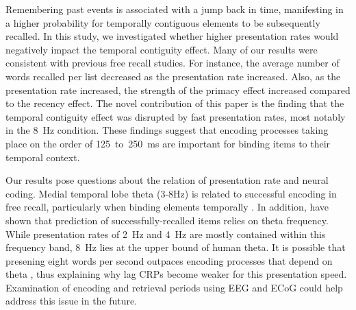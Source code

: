 \documentclass[10pt,letterpaper]{article}
\begin{document}
Remembering past events is associated with a jump back in time, manifesting in
a higher probability for temporally contiguous elements to be subsequently
recalled. In this study, we investigated whether higher presentation rates
would negatively impact the temporal contiguity effect. 
Many of our results were consistent with previous free recall studies. For
instance, the average number of words recalled per list decreased as the
presentation rate increased. Also, as the presentation rate increased, the
strength of the primacy effect increased compared to the recency effect.
The novel contribution of this paper is the finding that 
the temporal contiguity effect was disrupted by fast presentation rates, most
notably in the 8~Hz condition.   These findings suggest that encoding
processes taking place on the order of 125~to~250~ms are important for binding
items to their temporal context.

Our results pose questions about the relation of presentation rate and neural
coding. Medial temporal lobe theta (3-8Hz) is related to successful encoding
in free recall, particularly when binding elements temporally
\cite{NyhuCurr10,SedeEtal03}. In addition,  have shown that
prediction of successfully-recalled items relies on theta frequency. While
presentation rates of 2~Hz and 4~Hz are mostly contained within this frequency
band, 8~Hz lies at the upper bound of human theta. It is possible that
presening eight words per second outpaces encoding processes that depend on
theta \cite{HassEtal02}, thus explaining why lag CRPs become weaker for this
presentation speed. Examination of encoding and retrieval periods using EEG
and ECoG could help address this issue in the future.

\nocite{GudeEtal09}




\setlength{\bibleftmargin}{.125in}
\setlength{\bibindent}{-\bibleftmargin}


\end{document}
